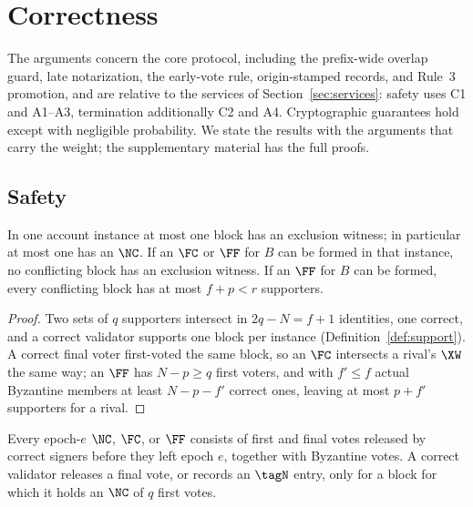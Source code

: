 \section{Correctness}
\label{sec:correctness}
The arguments concern the core protocol, including the prefix-wide overlap guard, late notarization, the early-vote rule, origin-stamped records, and Rule~3 promotion, and are relative to the services of Section~\ref{sec:services}: safety uses C1 and A1--A3, termination additionally C2 and A4. Cryptographic guarantees hold except with negligible probability. We state the results with the arguments that carry the weight; the supplementary material has the full proofs.

\subsection{Safety}
\begin{lemma}
\label{lem:exclusion}
In one account instance at most one block has an exclusion witness; in particular at most one has an $\NC$. If an $\FC$ or $\FF$ for $B$ can be formed in that instance, no conflicting block has an exclusion witness. If an $\FF$ for $B$ can be formed, every conflicting block has at most $f+p<r$ supporters.
\end{lemma}
\begin{proof}
Two sets of $q$ supporters intersect in $2q-N=f+1$ identities, one correct, and a correct validator supports one block per instance (Definition~\ref{def:support}). A correct final voter first-voted the same block, so an $\FC$ intersects a rival's $\XW$ the same way; an $\FF$ has $N-p\ge q$ first voters, and with $f'\le f$ actual Byzantine members at least $N-p-f'$ correct ones, leaving at most $p+f'$ supporters for a rival.
\end{proof}

\begin{lemma}
\label{lem:late}
Every epoch-$e$ $\NC$, $\FC$, or $\FF$ consists of first and final votes released by correct signers before they left epoch $e$, together with Byzantine votes. A correct validator releases a final vote, or records an $\tagN$ entry, only for a block for which it holds an $\NC$ of $q$ first votes.
\end{lemma}

